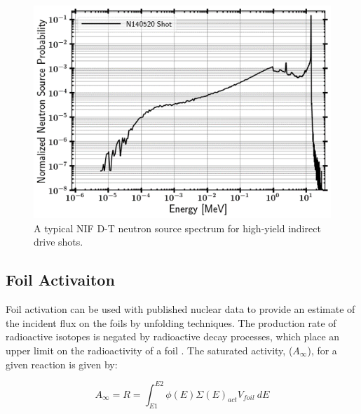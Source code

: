 \documentclass[journal]{IEEEtran}
\let\MYoriglatexcaption\caption
\renewcommand{\caption}[2][\relax]{\MYoriglatexcaption[#2]{#2}}
\begin{document}
	\begin{figure}[h!]
		\includegraphics[width=\linewidth]{Figures/NIFSRC.png}
		\caption{A typical NIF D-T neutron source spectrum for high-yield indirect drive shots.}
		\label{fig:NIFSRC}
	\end{figure}
	
	\subsection{Foil Activaiton}

Foil activation can be used with published 	nuclear data to provide an estimate of the incident flux on the foils by unfolding techniques. 
The production rate of radioactive isotopes is negated by radioactive decay processes, which place an upper limit on the radioactivity of a foil \cite{Knoll}. 
The saturated activity, ($A_{\infty}$), for a given reaction is given by: 

	\begin{equation} \label{eq:InfReactionRate}
	A_{\infty} = R = \int_{E1}^{E2} \phi(E) \Sigma(E)_{act} V_{foil} 
	\:dE 
	\end{equation}
	
\end{document}
